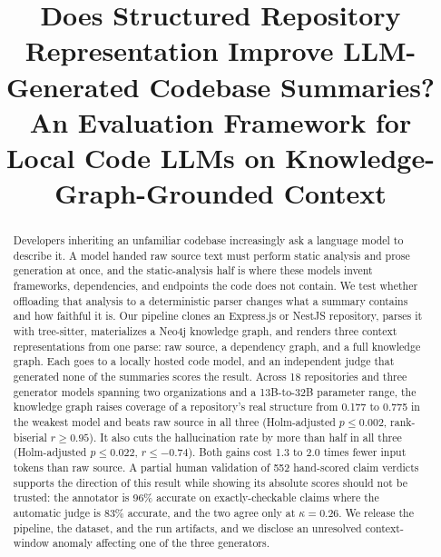 \documentclass[conference]{IEEEtran}
\begin{document}
\title{Does Structured Repository Representation Improve LLM-Generated Codebase Summaries?\\
\large An Evaluation Framework for Local Code LLMs on Knowledge-Graph-Grounded Context}

\author{
}

\maketitle

\begin{abstract}
Developers inheriting an unfamiliar codebase increasingly ask a language model to describe it.
A model handed raw source text must perform static analysis and prose generation at once, and
the static-analysis half is where these models invent frameworks, dependencies, and endpoints
the code does not contain. We test whether offloading that analysis to a deterministic parser
changes what a summary contains and how faithful it is. Our pipeline clones an Express.js or
NestJS repository, parses it with tree-sitter, materializes a Neo4j knowledge graph, and
renders three context representations from one parse: raw source, a dependency graph, and a
full knowledge graph. Each goes to a locally hosted code model, and an independent judge that
generated none of the summaries scores the result. Across 18 repositories and three generator
models spanning two organizations and a 13B-to-32B parameter range, the knowledge graph raises
coverage of a repository's real structure from 0.177 to 0.775 in the weakest model and beats
raw source in all three (Holm-adjusted $p\le0.002$, rank-biserial $r\ge0.95$). It also cuts the
hallucination rate by more than half in all three (Holm-adjusted $p\le0.022$, $r\le-0.74$).
Both gains cost 1.3 to 2.0 times fewer input tokens than raw source. A partial human validation
of 552 hand-scored claim verdicts supports the direction of this result while showing its
absolute scores should not be trusted: the annotator is 96\% accurate on exactly-checkable
claims where the automatic judge is 83\% accurate, and the two agree only at $\kappa=0.26$. We
release the pipeline, the dataset, and the run artifacts, and we disclose an unresolved
context-window anomaly affecting one of the three generators.
\end{abstract}
\end{document}
